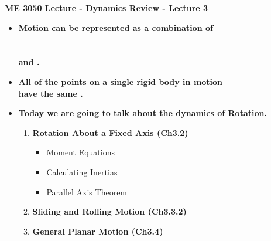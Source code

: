 \documentclass[11pt]{article}
\newcommand{\NUM}{3 }
\newcommand{\B}{\color{blue}}
\newcommand{\K}{\color{black}}
\begin{document}
\textbf{ \LARGE ME 3050 Lecture - Dynamics Review - Lecture \NUM  } \\

\begin{itemize}



	\item \textbf{ \Large Motion can be represented as a combination of \vspace{3mm}\\
\\\\ \underline{\hspace{60mm}} and \underline{\hspace{60mm}}.} \vspace{2mm}\\

\item \textbf{ \Large All of the points on a single rigid body in motion  \vspace{5mm}\\have the same \underline{\hspace{50mm}}.} \vspace{5mm}\\


	\item \textbf{ \Large Today we are going to talk about the dynamics of \B Rotation\K. } \\
\Large
	\begin{enumerate}
		\item \textbf{ Rotation About a \B Fixed Axis \K (Ch3.2)} \vspace{0mm} \\
		\begin{itemize}
		\item Moment Equations
		\item Calculating Inertias
		\item Parallel Axis Theorem\\
		\end{itemize}
		\item  \textbf{ \B Sliding \K and \B Rolling \K Motion (Ch3.3.2)} \vspace{3mm} \\
	
		\item  \textbf{ \B General Planar \K Motion (Ch3.4)}\vspace{3mm} \\
	
	\end{enumerate}


\end{itemize}
\end{document}
